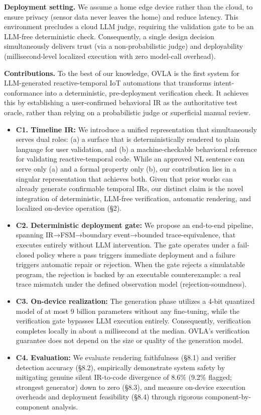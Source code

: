 \documentclass[sigconf,nonacm,anonymous,review]{acmart}
\begin{document}
\textbf{Deployment setting.} We assume a home edge device rather than the cloud, to ensure privacy (sensor data never leaves the home) and reduce latency.
This environment precludes a cloud LLM judge, requiring the validation gate to be an LLM-free deterministic check. Consequently, a single design decision simultaneously delivers trust (via a non-probabilistic judge) and deployability (millisecond-level localized execution with zero model-call overhead).

\medskip\noindent\textbf{Contributions.} 
To the best of our knowledge, OVLA is the first system for LLM-generated reactive-temporal IoT automations that transforms intent-conformance into a deterministic, pre-deployment verification check. It achieves this by establishing a user-confirmed behavioral IR as the authoritative test oracle, rather than relying on a probabilistic judge or superficial manual review.
\begin{itemize}
\item \textbf{C1. Timeline IR:} We introduce a unified representation that simultaneously serves dual roles:
(a) a surface that is deterministically rendered to plain language for user validation, and (b) a machine-checkable behavioral reference for validating reactive-temporal code. While an approved NL sentence can serve only (a) and a formal property only (b), our contribution lies in a singular representation that achieves both. Given that prior works can already generate confirmable temporal IRs, our distinct claim is the novel integration of deterministic, LLM-free verification, automatic rendering, and localized on-device operation
(\S2).
\item \textbf{C2. Deterministic deployment gate:} We propose an end-to-end pipeline, spanning IR→FSM→boundary event→bounded trace-equivalence, that executes entirely without LLM intervention. The gate operates under a fail-closed policy where a pass triggers immediate deployment and a failure triggers automatic repair or rejection.
When the gate rejects a simulatable program, the rejection is backed by an executable counterexample: a real trace mismatch under the defined observation model (rejection-soundness).
\item \textbf{C3. On-device realization:} The generation phase utilizes a 4-bit quantized model of at most 9 billion parameters without any fine-tuning, while the verification gate bypasses LLM execution entirely. Consequently, verification completes locally in about a millisecond at the median. OVLA's verification guarantee does not depend on the size or quality of the generation model.
\item \textbf{C4. Evaluation:} We evaluate rendering faithfulness (\S8.1) and verifier detection accuracy (\S8.2), empirically demonstrate system safety by mitigating genuine silent IR-to-code divergence of 8.6\% (9.2\% flagged; strongest generator) down to zero (\S8.3), and measure on-device execution overheads and deployment feasibility (\S8.4) through rigorous component-by-component analysis.
\end{itemize}
\end{document}
